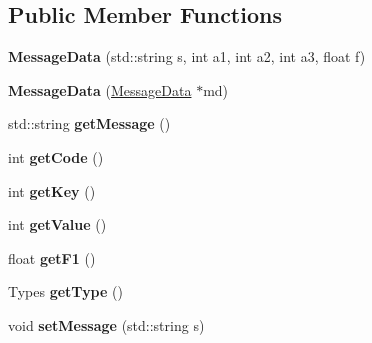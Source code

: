 \subsection*{Public Member Functions}
\begin{DoxyCompactItemize}
\item 
{\bfseries Message\+Data} (std\+::string s, int a1, int a2, int a3, float f)\hypertarget{classosc_1_1MessageData_af370333b9828ad63ba1031ac941300c2}{}\label{classosc_1_1MessageData_af370333b9828ad63ba1031ac941300c2}

\item 
{\bfseries Message\+Data} (\hyperlink{classosc_1_1MessageData}{Message\+Data} $\ast$md)\hypertarget{classosc_1_1MessageData_acf5694351e2f877340d6b38044d8b2d3}{}\label{classosc_1_1MessageData_acf5694351e2f877340d6b38044d8b2d3}

\item 
std\+::string {\bfseries get\+Message} ()\hypertarget{classosc_1_1MessageData_a8bf658a5be5789142fa260512fded9a1}{}\label{classosc_1_1MessageData_a8bf658a5be5789142fa260512fded9a1}

\item 
int {\bfseries get\+Code} ()\hypertarget{classosc_1_1MessageData_aa625a45bf78b8351d29a7696c8f014e9}{}\label{classosc_1_1MessageData_aa625a45bf78b8351d29a7696c8f014e9}

\item 
int {\bfseries get\+Key} ()\hypertarget{classosc_1_1MessageData_ab70773361a5ffba488a83b0d87cfb25c}{}\label{classosc_1_1MessageData_ab70773361a5ffba488a83b0d87cfb25c}

\item 
int {\bfseries get\+Value} ()\hypertarget{classosc_1_1MessageData_af79bf248fbb542bd25984f7f2b3993eb}{}\label{classosc_1_1MessageData_af79bf248fbb542bd25984f7f2b3993eb}

\item 
float {\bfseries get\+F1} ()\hypertarget{classosc_1_1MessageData_ad1e951e980e59c5d222b79856cae6d32}{}\label{classosc_1_1MessageData_ad1e951e980e59c5d222b79856cae6d32}

\item 
Types {\bfseries get\+Type} ()\hypertarget{classosc_1_1MessageData_a38c69b7ebcf46e7c19ff2409af36a7ae}{}\label{classosc_1_1MessageData_a38c69b7ebcf46e7c19ff2409af36a7ae}

\item 
void {\bfseries set\+Message} (std\+::string s)\hypertarget{classosc_1_1MessageData_a1da8f45a1453c7d11029fa360d7a642c}{}\label{classosc_1_1MessageData_a1da8f45a1453c7d11029fa360d7a642c}


\end{DoxyCompactItemize}
